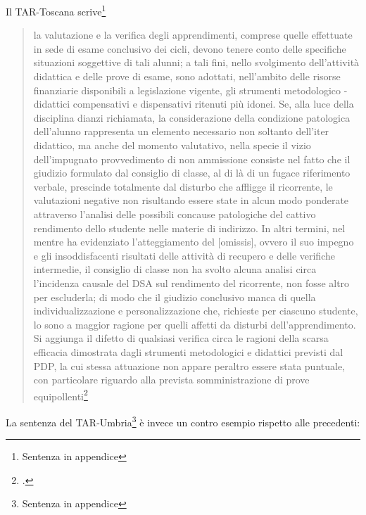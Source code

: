 Il TAR-Toscana scrive\footnote{Sentenza in appendice}
 \begin{quote}
 \mancatesto
 la valutazione e la verifica degli apprendimenti, comprese quelle effettuate in sede
 di esame conclusivo dei cicli, devono tenere conto delle specifiche situazioni soggettive di tali
 alunni; a tali fini, nello svolgimento dell'attività didattica e delle prove di esame, sono adottati,
 nell'ambito delle risorse finanziarie disponibili a legislazione vigente, gli strumenti metodologico -
 didattici compensativi e dispensativi ritenuti più idonei. Se, alla luce della disciplina dianzi
 richiamata, la considerazione della condizione patologica dell'alunno rappresenta un elemento
 necessario non soltanto dell'iter didattico, ma anche del momento valutativo, nella specie il vizio
 dell'impugnato provvedimento di non ammissione consiste nel fatto che il giudizio formulato dal
 consiglio di classe, al di là di un fugace riferimento verbale, prescinde totalmente dal disturbo che
 affligge il ricorrente, le valutazioni negative non risultando essere state in alcun modo ponderate
 attraverso l'analisi delle possibili concause patologiche del cattivo rendimento dello studente nelle
 materie di indirizzo. In altri termini, nel mentre ha evidenziato l'atteggiamento  del [omissis], ovvero il suo impegno  e gli
 insoddisfacenti risultati delle attività di recupero e delle verifiche intermedie, il consiglio di classe
 non ha svolto alcuna analisi circa l'incidenza causale del DSA sul rendimento del ricorrente, non
 fosse altro per escluderla; di modo che il giudizio conclusivo manca di quella individualizzazione e
 personalizzazione che, richieste per ciascuno studente, lo sono a maggior ragione per quelli affetti
 da disturbi dell'apprendimento.
 Si aggiunga il difetto di qualsiasi verifica circa le ragioni della scarsa efficacia dimostrata dagli
 strumenti metodologici e didattici previsti dal PDP, la cui stessa attuazione non appare peraltro
 essere stata puntuale, con particolare riguardo alla prevista somministrazione di prove equipollenti\footcite{tartoscana346}\mancatesto
 \end{quote}
La sentenza del TAR-Umbria\footnote{Sentenza in appendice} è invece un contro esempio rispetto alle precedenti:

